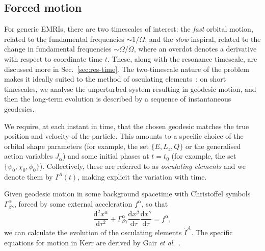 \documentclass[aps,prd,amsfonts,amssymb,amsmath,nofootinbib,showpacs,superscriptaddress,twocolumn]{revtex4}
\newcommand{\secref}[1]{Sec.\ \ref{sec:#1}}
\newcommand{\dd}{\ensuremath{\mathrm{d}}}
\newcommand{\diff}[2]{\ensuremath{\dfrac{\dd {#1}}{\dd {#2}}}}
\newcommand{\difftwo}[2]{\ensuremath{\dfrac{\dd^2 {#1}}{\dd {#2}^2}}}
\begin{document}


\subsection{Forced motion}
\label{sec:forced-motion}

For generic EMRIs, there are two timescales of interest: the \emph{fast} orbital motion, related to the fundamental frequencies $\sim1/\Omega$, and the \emph{slow} inspiral, related to the change in fundamental frequencies $\sim\Omega/\dot{\Omega}$, where an overdot denotes a derivative with respect to coordinate time $t$. These, along with the resonance timescale, are discussed more in \secref{res-time}. The two-timescale nature of the problem makes it ideally suited to the method of osculating elements~\cite{Gair2011a}: on short timescales, we analyse the unperturbed system resulting in geodesic motion, and then the long-term evolution is described by a sequence of instantaneous geodesics.

We require, at each instant in time, that the chosen geodesic matches the true position and velocity of the particle. This amounts to a specific choice of the orbital shape parameters (for example, the set $\{E,L_z,Q\}$ or the generalised action variables $J_\alpha$) and some initial phases at $t=t_0$ (for example, the set $\{\psi_0,\chi_0,\phi_0\}$). Collectively, these are referred to as \emph{osculating elements} and we denote them by $I^A(t)$, making explicit the variation with time.

Given geodesic motion in some background spacetime with Christoffel symbols $\Gamma^\alpha_{\beta\gamma}$, forced by some external acceleration $f^\alpha$, so that
\begin{equation}
\difftwo{x^\alpha}{\tau} + \Gamma^\alpha_{\beta\gamma}\diff{x^\beta}{\tau}\diff{x^\gamma}{\tau} = f^\alpha,
\end{equation}
we can calculate the evolution of the osculating elements $\dot{I}^A$. The specific equations for motion in Kerr are derived by Gair {\it{et al}}.~\cite{Gair2011a}.
\end{document}
